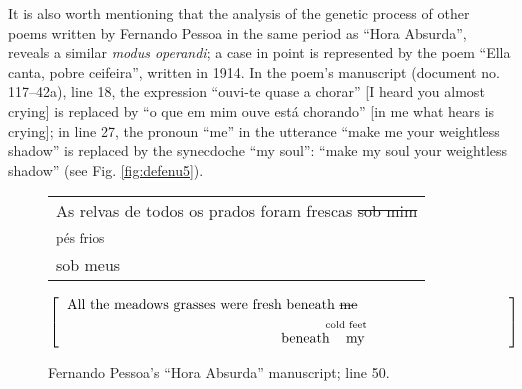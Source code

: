 \begin{paper}
It is also worth mentioning that the analysis of the genetic process of
other poems written by Fernando Pessoa in the same period as ``Hora
Absurda'', reveals a similar \emph{modus operandi}; a case in point is
represented by the poem ``Ella canta, pobre ceifeira'', written in 1914.
In the poem's manuscript (document no. 117--42a), line 18, the expression
``ouvi-te quase a chorar'' [I heard you almost crying] is replaced
by ``o que em mim ouve está chorando'' [in me what hears is crying];
in line 27, the pronoun ``me'' in the utterance ``make me your
weightless shadow'' is replaced by the synecdoche ``my soul'': ``make my
soul your weightless shadow'' (see Fig. \ref{fig:defenu5}).

\begin{figure}[H]
    \begin{center}
    \begin{tabular}{p{}}
        As relvas de todos os prados foram frescas \sout{sob mim} \\
        \hspace{20em}\textsubscript{pés frios} \\
        \hspace{18em} sob \hspace{.5em} meus \\
    \end{tabular}
    \end{center}

    \begin{center}
    \begin{equation*}
    	\left[\begin{tabular}{p{.9\textwidth}}
       		\text{All the meadows grasses were fresh beneath \sout{me}} \\
        	\text{\hspace{18.5em}\textsubscript{cold feet}} \\
            \text{\hspace{15em} beneath \hspace{.5em} my}
    	\end{tabular}\right]
    \end{equation*}
    \end{center}

    \caption{Fernando Pessoa's ``Hora Absurda'' manuscript; line 50.\protect\footnotemark} 
    \label{fig:defenu3}
\end{figure}
\null
\vfill


\end{paper}
